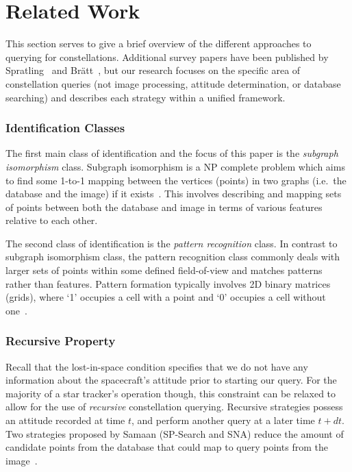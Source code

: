 \newcommand{\nsubparagraph}[1]{\subsubsection{#1}}

\section{Related Work}\label{sec:relatedWork}
This section serves to give a brief overview of the different approaches to querying for constellations.
Additional survey papers have been published by Spratling~\cite{spratling:surveyStarIdentification} and
Br\"{a}tt~\cite{bratt:analysisStarIdentification}, but our research focuses on the specific area of constellation
queries (not image processing, attitude determination, or database searching) and describes each strategy within a
unified framework.

\nsubparagraph{Identification Classes}
The first main class of identification and the focus of this paper is the \textit{subgraph isomorphism} class.
Subgraph isomorphism is a NP complete problem which aims to find some 1-to-1 mapping between the vertices (points) in
two graphs (i.e.\ the database and the image) if it exists~\cite{scott:graphIsomorphismProblem}.
This involves describing and mapping sets of points between both the database and image in terms of various features
relative to each other.

The second class of identification is the \textit{pattern recognition} class.
In contrast to subgraph isomorphism class, the pattern recognition class commonly deals with larger sets of points
within some defined field-of-view and matches patterns rather than features.
Pattern formation typically involves 2D binary matrices (grids), where `1' occupies a cell with a point and `0' occupies
a cell without one~\cite{padgett:gridAlgorithm}.

%
%
%

\nsubparagraph{Recursive Property}
Recall that the lost-in-space condition specifies that we do not have any information about the spacecraft's attitude
prior to starting our query.
For the majority of a star tracker's operation though, this constraint can be relaxed to allow for the use of
\textit{recursive} constellation querying.
Recursive strategies possess an attitude recorded at time $t$, and perform another query at a later time $t + dt$.
Two strategies proposed by Samaan (SP-Search and SNA) reduce the amount of candidate points from the database that could
map to query points from the image~\cite{samaan:recursiveMode}.

